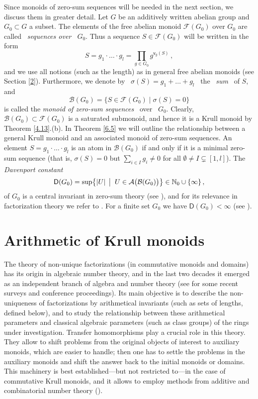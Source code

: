 \documentclass[a4paper]{amsart}
\theoremstyle{definition}
\numberwithin{equation}{section}
\begin{document}
Since monoids of zero-sum sequences will be needed in the next
section, we discuss them in greater detail. Let $G$ be an additively
written abelian group and $G_0 \subset G$ a subset. The elements of
the free abelian monoid $\mathcal F(G_0)$ over $G_0$ are called \
{\it sequences over \ $G_0$}. Thus a sequence $S \in \mathcal
F(G_0)$ will be written in the form
\[
S = g_1 \cdot \ldots \cdot g_l = \prod_{g \in G_0} g^{\mathsf v_g
(S)}\,,
\]
and we use all notions (such as the length) as in general free
abelian monoids (see Section \ref{2}). Furthermore,  we denote by  \
$\sigma (S) = g_1+ \ldots + g_l$ \ the \ {\it sum} \ of $S$, and
\[
\mathcal B(G_0) = \{ S \in \mathcal F(G_0) \mid \sigma (S) =0\}
\]
is called the {\it monoid of zero-sum sequences} \ over \ $G_0$.
Clearly, $\mathcal B (G_0) \subset \mathcal F (G_0)$ is a saturated
submonoid, and hence it is a Krull monoid by Theorem \ref{4.13}.(b).
In Theorem \ref{6.5} we will outline the relationship between a
general Krull monoid and an associated monoid of zero-sum sequences.
An element $S = g_1 \cdot \ldots \cdot g_l$ is an atom in $\mathcal
B (G_0)$ if and only if it is a minimal zero-sum sequence (that is,
$\sigma (S) = 0$ but $\sum_{i \in I} g_i \ne 0$ for all $\emptyset
\ne I \subsetneq [1,l]$). The {\it Davenport constant}
\[
\mathsf  D (G_0) = \sup \bigl\{ |U| \, \bigm| \; U \in \mathcal A
\big( \mathcal B (G_0) \big) \bigr\} \in {\mathbb N}_0 \cup \{\infty\} \,,
\]
of $G_0$  is a central invariant in zero-sum theory (see
\cite{Ga-Ge06b}), and for its relevance in factorization theory we
refer to \cite{ Ge09a}. For a finite set $G_0$ we have $\mathsf D
(G_0) < \infty$ (see \cite[Theorem 3.4.2]{Ge-HK06a}).

\bigskip
\section{Arithmetic of Krull monoids} \label{6}
\bigskip

The theory of non-unique factorizations (in commutative monoids and
domains) has its origin in algebraic number theory, and in the last
two decades it emerged as an independent branch of algebra and
number theory (see \cite{An97,Ch-Gl00,Ch05a,Ge-HK06b, Ge-HK06a} for
some recent surveys and conference proceedings). Its main objective
is to describe the non-uniqueness of factorizations by arithmetical
invariants (such as sets of lengths,  defined below), and to study
the relationship between these arithmetical parameters and classical
algebraic parameters (such as class groups) of the rings under
investigation. Transfer homomorphisms play a crucial role in this
theory. They allow to shift problems from the original objects of
interest to auxiliary monoids, which are easier to handle; then one
has to settle the problems in the auxiliary monoids and shift the
answer back to the initial monoids or domains. This machinery is
best established---but not restricted to---in the case of
commutative Krull monoids, and it allows to employ methods from
additive and combinatorial number theory (\cite{Ge09a}).
\end{document}
